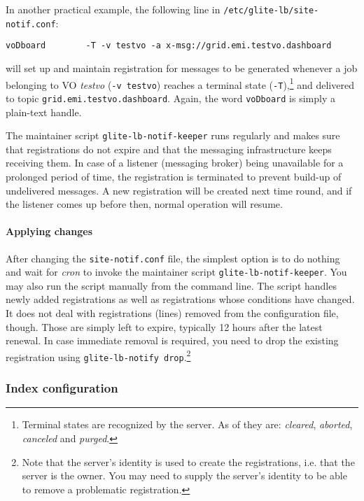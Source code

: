 In another practical example, the following line in \texttt{/etc/glite-lb/site-notif.conf}:

\begin{verbatim}
voDboard        -T -v testvo -a x-msg://grid.emi.testvo.dashboard
\end{verbatim}

\indent{}will set up and maintain registration for messages to be generated whenever a job belonging to VO \emph{testvo} (\texttt{-v testvo}) reaches a terminal state (\texttt{-T}),\footnote{Terminal states are recognized by the server. As of  they are: \emph{cleared}, \emph{aborted}, \emph{canceled} and \emph{purged}.} and delivered to topic \texttt{grid.emi.testvo.dashboard}. Again, the word \texttt{voDboard} is simply a plain-text handle.

The maintainer script \texttt {glite-lb-notif-keeper} runs regularly and makes sure that registrations do not expire and that the messaging infrastructure keeps receiving them. In case of a listener (messaging broker) being unavailable for a prolonged period of time, the registration is terminated to prevent build-up of undelivered messages. A new registration will be created next time round, and if the listener comes up before then, normal operation will resume.

\paragraph{Applying changes} After changing the \texttt{site-notif.conf} file, the simplest option is to do nothing and wait for \emph{cron} to invoke the maintainer script \texttt{glite-lb-notif-keeper}. You may also run the script manually from the command line. The script handles newly added registrations as well as registrations whose conditions have changed. It does not deal with registrations (lines) removed from the configuration file, though. Those are simply left to expire, typically 12 hours after the latest renewal. In case immediate removal is required, you need to drop the existing registration using \texttt{glite-lb-notify drop}.\footnote{Note that the server's identity is used to create the registrations, i.e. that the server is the owner. You may need to supply the server's identity to be able to remove a problematic registration.}

\subsubsection{Index configuration}

